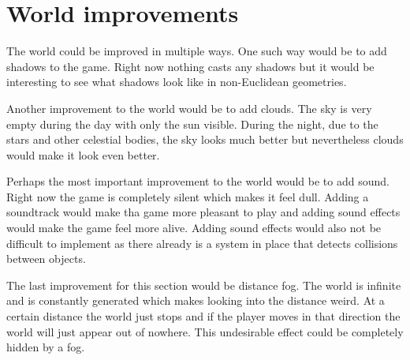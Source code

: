 \section{World improvements}
The world could be improved in multiple ways.
One such way would be to add shadows to the game.
Right now nothing casts any shadows but it would be interesting to see what shadows look like in non-Euclidean geometries.

Another improvement to the world would be to add clouds.
The sky is very empty during the day with only the sun visible.
During the night, due to the stars and other celestial bodies, the sky looks much better but nevertheless clouds would make it look even better.

Perhaps the most important improvement to the world would be to add sound.
Right now the game is completely silent which makes it feel dull.
Adding a soundtrack would make tha game more pleasant to play and adding sound effects would make the game feel more alive.
Adding sound effects would also not be difficult to implement as there already is a system in place that detects collisions between objects.

The last improvement for this section would be distance fog.
The world is infinite and is constantly generated which makes looking into the distance weird.
At a certain distance the world just stops and if the player moves in that direction the world will just appear out of nowhere.
This undesirable effect could be completely hidden by a fog.